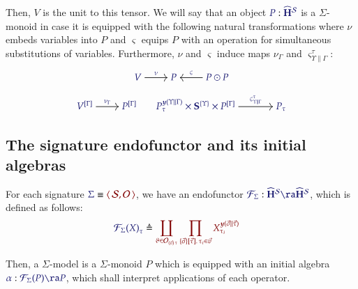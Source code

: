 \documentclass[11pt]{article}
\theoremstyle{definition}
\theoremstyle{remark}
\numberwithin{equation}{section}
\newcommand\HypCat{\mathbf{H}}
\begin{document}
Then, $V$ is the unit to this tensor. We will say that an object
$\Of{P}{\widehat{\HypCat}^\Sorts}$ is a $\Sigma$-monoid in case it is equipped
with the following natural transformations where $\nu$ embeds variables into $P$
and $\varsigma$ equips $P$ with an operation for simultaneous substitutions of
variables. Furthermore, $\nu$ and $\varsigma$ induce maps ${\nu}_{\Gamma}$ and
${\varsigma}^{\tau}_{\Upsilon\parallel\Gamma}$:
\begin{gather*}
  \begin{tikzcd}[cramped, ampersand replacement = \&]
    {\IMode{V}} \arrow[r, "\IMode\nu"]
    \&
    {\IMode{P}}
    \&
    {\IMode{P\odot P}}
      \arrow[l, swap, "\IMode\varsigma"]
  \end{tikzcd}\\[6pt]
  \begin{tikzcd}[cramped, ampersand replacement = \&]
    {\IMode{{V}^{[\Gamma]}}}
      \arrow[r, "\IMode{{\nu}_{\Gamma}}"]
    \&
    {\IMode{{P}^{[\Gamma]}}}
  \end{tikzcd}
  \qquad
  \begin{tikzcd}[cramped, sep = large, ampersand replacement = \&]
    {\IMode{{P_\tau^{\Yoneda{\Upsilon\parallel\Gamma}}\times \SymPsh^{\{\Upsilon\}}\times P^{[\Gamma]}}}}
      \arrow[r, "\IMode{\varsigma^\tau_{\Upsilon\parallel\Gamma}}"]
    \&
    {\IMode{P_\tau}}
  \end{tikzcd}
\end{gather*}

\subsection{The signature endofunctor and its initial algebras}

For each signature $\Match{\Sigma}{\Pair{\Sorts}{\Operators}}$, we have an
endofunctor
$\Of{\SigFun{\Sigma}}{\widehat{\HypCat}^\Sorts\ra\widehat{\HypCat}^\Sorts}$,
which is defined as follows:
\begin{align*}
  \IMode{{\SigFun{\Sigma}(X)}_{\tau}}
&
    \triangleq
    \OMode{
      \coprod_{
        \vartheta\in \Operators_{\MkArity{\vec{v}}{\tau}}
      }
      \prod_{
        \MkValence
          {\vec{\sigma}}
          {\vec{\tau}}
          {\tau_i}
        \in\vec{v}
      }
      X_{\tau_i}^{\Yoneda{\vec{\sigma}\parallel\vec{\tau}}}
    }
\end{align*}

Then, a $\Sigma$-model is a $\Sigma$-monoid $P$ which is equipped with an
initial algebra $\Of{\alpha}{\SigFun{\Sigma}(P)\ra P}$, which shall interpret
applications of each operator.
\end{document}
